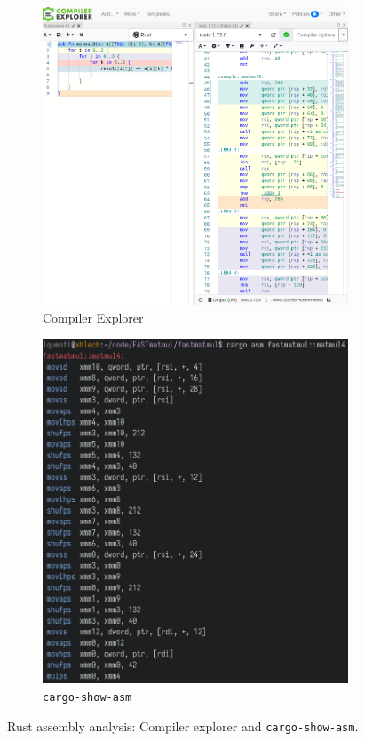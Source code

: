 \begin{figure}[H]
\centering
\begin{subfigure}{.5\textwidth}
  \centering
  \includegraphics[width=\linewidth]{./assets/compexp}
  \caption{Compiler Explorer}
\end{subfigure}%
\begin{subfigure}{.45\textwidth}
  \centering
  \includegraphics[width=\linewidth]{./assets/cargoasm}
  \caption{\texttt{cargo-show-asm}}
\end{subfigure}
  \caption{Rust assembly analysis: Compiler explorer and \texttt{cargo-show-asm}.}
\end{figure}

